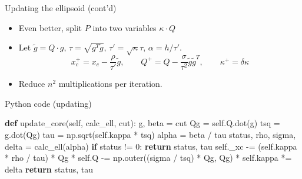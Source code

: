 \documentclass[10pt,ignorenonframetext,serif,onlymath]{beamer}
\newenvironment{Shaded}{}{}
\newcommand{\ControlFlowTok}[1]{\textcolor[rgb]{0.00,0.44,0.13}{\textbf{#1}}}
\newcommand{\DecValTok}[1]{\textcolor[rgb]{0.25,0.63,0.44}{#1}}
\newcommand{\KeywordTok}[1]{\textcolor[rgb]{0.00,0.44,0.13}{\textbf{#1}}}
\newcommand{\NormalTok}[1]{#1}
\newcommand{\OperatorTok}[1]{\textcolor[rgb]{0.40,0.40,0.40}{#1}}
\newcommand{\VariableTok}[1]{\textcolor[rgb]{0.10,0.09,0.49}{#1}}
\providecommand{\tightlist}{%
  \setlength{\itemsep}{0pt}\setlength{\parskip}{0pt}}
\begin{document}
\begin{frame}{Updating the ellipsoid (cont’d)}
\protect\hypertarget{sec:updating-the-ellipsoid-contd}{}

\begin{itemize}
\tightlist
\item
  Even better, split \(P\) into two variables \(\kappa \cdot Q\)
\item
  Let \(\tilde{g} = Q \cdot g\), \(\tau = \sqrt{g^T\tilde{g}}\),
  \(\tau' = \sqrt{\kappa} \tau\), \(\alpha = h/\tau'\).
  \[x_c^+ = x_c - \frac{\rho}{\tau'} \tilde{g}, \qquad
  Q^+ = Q - \frac{\sigma}{\tau^2} \tilde{g}\tilde{g}^T, \qquad
  \kappa^+ =  \delta \kappa
   \]
\item
  Reduce \(n^2\) multiplications per iteration.
\end{itemize}

\end{frame}

\begin{frame}[fragile]{Python code (updating)}
\protect\hypertarget{sec:python-code-updating}{}

\begin{Shaded}
\begin{Highlighting}[]
\KeywordTok{def}\NormalTok{ update_core(}\VariableTok{self}\NormalTok{, calc_ell, cut):}
\NormalTok{    g, beta }\OperatorTok{=}\NormalTok{ cut}
\NormalTok{    Qg }\OperatorTok{=} \VariableTok{self}\NormalTok{.Q.dot(g)}
\NormalTok{    tsq }\OperatorTok{=}\NormalTok{ g.dot(Qg)}
\NormalTok{    tau }\OperatorTok{=}\NormalTok{ np.sqrt(}\VariableTok{self}\NormalTok{.kappa }\OperatorTok{*}\NormalTok{ tsq)}
\NormalTok{    alpha }\OperatorTok{=}\NormalTok{ beta }\OperatorTok{/}\NormalTok{ tau}
\NormalTok{    status, rho, sigma, delta }\OperatorTok{=}\NormalTok{ calc_ell(alpha)}
    \ControlFlowTok{if}\NormalTok{ status }\OperatorTok{!=} \DecValTok{0}\NormalTok{:}
        \ControlFlowTok{return}\NormalTok{ status, tau}
    \VariableTok{self}\NormalTok{._xc }\OperatorTok{-=}\NormalTok{ (}\VariableTok{self}\NormalTok{.kappa }\OperatorTok{*}\NormalTok{ rho }\OperatorTok{/}\NormalTok{ tau) }\OperatorTok{*}\NormalTok{ Qg}
\OperatorTok{*}   \VariableTok{self}\NormalTok{.Q }\OperatorTok{-=}\NormalTok{ np.outer((sigma }\OperatorTok{/}\NormalTok{ tsq) }\OperatorTok{*}\NormalTok{ Qg, Qg)}
\OperatorTok{*}   \VariableTok{self}\NormalTok{.kappa }\OperatorTok{*=}\NormalTok{ delta}
    \ControlFlowTok{return}\NormalTok{ status, tau}
\end{Highlighting}
\end{Shaded}

\end{frame}
\end{document}

